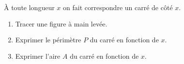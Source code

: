 \documentclass[exercice]{thedocument}%
\begin{document}
%
À toute longueur $x$ on fait correspondre un carré de côté $x$.
\begin{enumerate}
  \item Tracer une figure à main levée.
  \item Exprimer le périmètre $P$ du carré en fonction de $x$.
  \item Exprimer l'aire $A$ du carré en fonction de $x$.
\end{enumerate}
\end{document}
